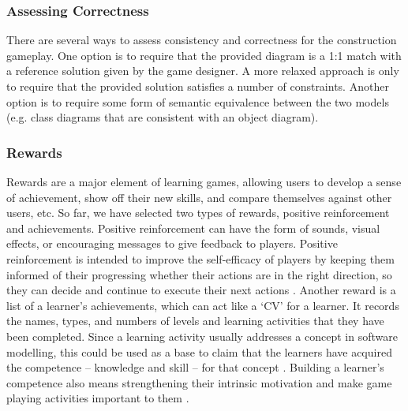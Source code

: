 \documentclass[conference]{IEEEtran}
\begin{document}
\subsubsection{Assessing Correctness} 
\label{Assessing Correctness} 
There are several ways to assess consistency and correctness for the construction gameplay. One option is to require that the provided diagram is a 1:1 match with a reference solution given by the game designer. A more relaxed approach is only to require that the provided solution satisfies a number of constraints. Another option is to require some form of semantic equivalence between the two models (e.g. class diagrams that are consistent with an object diagram). 

\subsubsection{Rewards}
\label{Rewards}
Rewards are a major element of learning games, allowing users to develop a sense of achievement, show off their new skills, and compare themselves against other users, etc. So far, we have selected two types of rewards, positive reinforcement and achievements. Positive reinforcement can have the form of sounds, visual effects, or encouraging messages to give feedback to players. Positive reinforcement is intended to improve the self-efficacy of players by keeping them informed of their progressing whether their actions are in the right direction, so they can decide and continue to execute their next actions \cite{richter2015studying}. Another reward is a list of a learner's achievements, which can act like a `CV' for a learner. It records the names, types, and numbers of levels and learning activities that they have been completed. Since a learning activity usually addresses a concept in software modelling, this could be used as a base to claim that the learners have acquired the competence -- knowledge and skill -- for that concept \cite{richter2015studying}. Building a learner's competence also means strengthening their intrinsic motivation \cite{ryan2017self} and make game playing  activities important to them \cite{nicholson2015recipe}.
\end{document}
